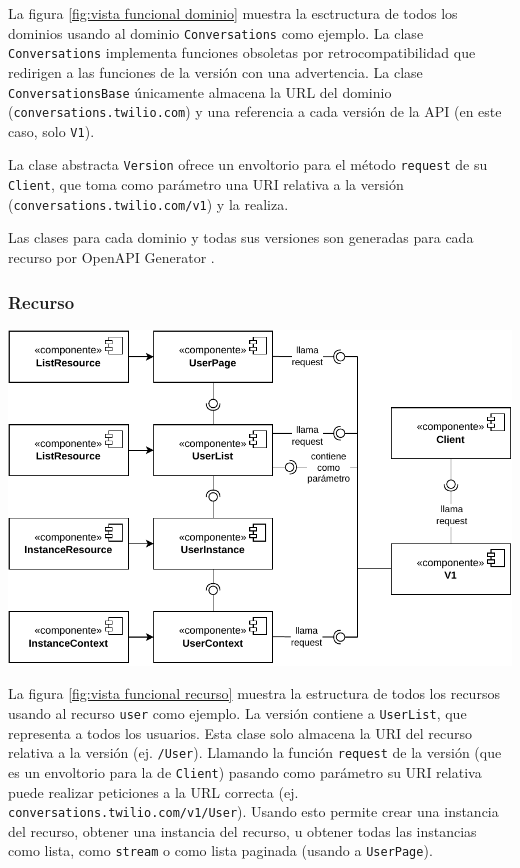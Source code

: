 \documentclass{article}
\begin{document}
\hfill

La figura \ref{fig:vista funcional dominio}
muestra la esctructura de todos los dominios
usando al dominio \verb|Conversations| como ejemplo.
La clase \verb|Conversations| implementa funciones obsoletas por retrocompatibilidad
que redirigen a las funciones de la versión con una advertencia.
La clase \verb|ConversationsBase| únicamente almacena la URL del dominio
(\verb|conversations.twilio.com|)
y una referencia a cada versión de la API
(en este caso, solo \verb|V1|).

La clase abstracta \verb|Version|
ofrece un envoltorio para el método \verb|request| de su \verb|Client|,
que toma como parámetro una URI relativa a la versión
(\verb|conversations.twilio.com/v1|)
y la realiza.

Las clases para cada dominio y todas sus versiones
son generadas para cada recurso por OpenAPI Generator
\cite{twilio-generated-openapi}.

\newpage

\subsubsection{Recurso}

\hfill

\begin{center}
  \includegraphics[width=\textwidth]{VistaFuncionalRecurso.pdf}
  \label{fig:vista funcional recurso}
\end{center}

\hfill

La figura \ref{fig:vista funcional recurso}
muestra la estructura de todos los recursos
usando al recurso \verb|user| como ejemplo.
La versión contiene a \verb|UserList|,
que representa a todos los usuarios.
Esta clase solo almacena la URI del recurso relativa a la versión
(ej. \verb|/User|).
Llamando la función \verb|request| de la versión
(que es un envoltorio para la de \verb|Client|)
pasando como parámetro su URI relativa
puede realizar peticiones a la URL correcta
(ej. \verb|conversations.twilio.com/v1/User|).
Usando esto permite crear una instancia del recurso,
obtener una instancia del recurso,
u obtener todas las instancias
como lista, como \verb|stream| o como lista paginada
(usando a \verb|UserPage|).
\end{document}

